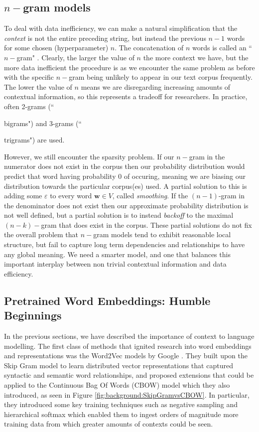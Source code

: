 \subsection{$n-$gram models} \label{section:background:ngram}
To deal with data inefficiency, we can make a natural simplification that the \textit{context} is not the entire preceding string, but instead the previous $n-1$ words for some chosen (hyperparameter) $n$. The concatenation of $n$ words is called an ``$n-$gram" \cite{Brown}. Clearly, the larger the value of $n$ the more context we have, but the more data inefficient the procedure is as we encounter the same problem as before with the specific $n-$gram being unlikely to appear in our text corpus frequently. The lower the value of $n$ means we are disregarding increasing amounts of contextual information, so this represents a tradeoff for researchers. In practice, often 2-grams (``{{\color{red} bi}grams") and 3-grams (``{{\color{red} tri}grams") are used.

However, we still encounter the sparsity problem. If our $n-$gram in the numerator does not exist in the corpus then our probability distribution would predict that word having probability 0 of occuring, meaning we are biasing our distribution towards the particular corpus(es) used. A partial solution to this is adding some $\varepsilon$ to every word $\mathbf{w} \in V$, called \textit{smoothing}. If the $(n-1)$-gram in the denominator does not exist then our approximate probability distribution is not well defined, but a partial solution is to instead \textit{backoff} to the maximal $(n-k)-$gram that does exist in the corpus. These partial solutions do not fix the overall problem that $n-$gram models tend to exhibit reasonable local structure, but fail to capture long term dependencies and relationships to have any global meaning. We need a smarter model, and one that balances this important interplay between non trivial contextual information and data efficiency.


\subsection{Pretrained Word Embeddings: Humble Beginnings} \label{section:background:wordembeddings}

In the previous sections, we have described the importance of context to language modelling. The first class of methods that ignited research into word embeddings and representations was the Word2Vec models by Google \cite{Mikolov}. They built upon the Skip Gram model \cite{Mikolov2013} to learn distributed vector representations that captured syntactic and semantic word relationships, and proposed extensions that could be applied to the Continuous Bag Of Words (CBOW) model which they also introduced, as seen in Figure \ref{fig:background:SkipGramvsCBOW}. In particular, they introduced some key training techniques such as negative sampling and hierarchical softmax which enabled them to ingest orders of magnitude more training data from which greater amounts of contexts could be seen.

}}
